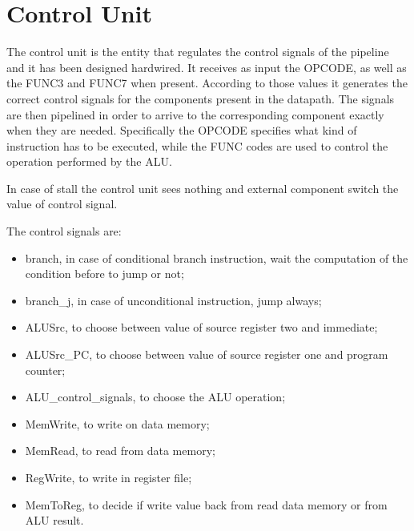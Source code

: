 %
\chapter{Control Unit}
\label{cha3}
The control unit is the entity that regulates the control signals of the pipeline and it has been designed hardwired.
It receives as input the OPCODE, as well as the FUNC3 and FUNC7 when present. 
According to those values it generates the correct control signals for the components present in the datapath. The signals are then pipelined in order to 
arrive to the corresponding component exactly when they are needed. Specifically the OPCODE specifies what kind of instruction has to be executed, while the
FUNC codes are used to control the operation performed by the ALU.

In case of stall the control unit sees nothing and external component switch the value of control signal.

The control signals are:
\begin{itemize}
    \item branch, in case of conditional branch instruction, wait the computation of the condition before to jump or not;
    \item branch\_j, in case of unconditional instruction, jump always;
    \item ALUSrc, to choose between value of source register two and immediate;
    \item ALUSrc\_PC, to choose between value of source register one and program counter;
    \item ALU\_control\_signals, to choose the ALU operation;
    \item MemWrite, to write on data memory;
    \item MemRead, to read from data memory;
    \item RegWrite, to write in register file;
    \item MemToReg, to decide if write value back from read data memory or from ALU result.
\end{itemize}



